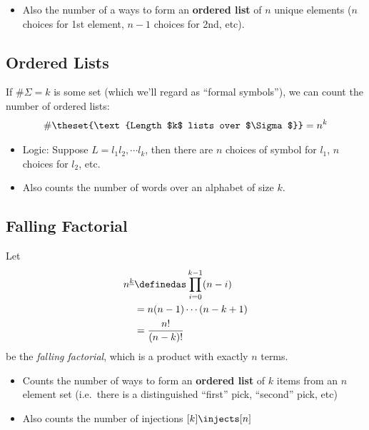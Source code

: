 \begin{itemize}
\tightlist
\item
  Also the number of a ways to form an \textbf{ordered list} of \(n\)
  unique elements (\(n\) choices for 1st element, \(n-1\) choices for
  2nd, etc).
\end{itemize}

\hypertarget{ordered-lists}{%
\subsection{Ordered Lists}\label{ordered-lists}}

If \(\#\Sigma = k\) is some set (which we'll regard as ``formal
symbols''), we can count the number of ordered lists:
\begin{align*}
\# \theset{\text{Length $k$ lists over $\Sigma$}} = n^k
\end{align*}

\begin{itemize}
\tightlist
\item
  Logic: Suppose \(L = l_1 l_2, \cdots l_k\), then there are \(n\)
  choices of symbol for \(l_1\), \(n\) choices for \(l_2\), etc.
\item
  Also counts the number of words over an alphabet of size \(k\).
\end{itemize}

\hypertarget{falling-factorial}{%
\subsection{Falling Factorial}\label{falling-factorial}}

Let
\begin{align*}\begin{aligned}
n^{\underline k} &\definedas \prod_{i=0}^{k-1}(n - i) \\
&= n(n-1)\cdots (n-k+1) \\
&= \frac{n!}{(n-k)!}
\end{aligned}\end{align*} be the \emph{falling factorial}, which is a
product with exactly \(n\) terms.

\begin{itemize}
\tightlist
\item
  Counts the number of ways to form an \textbf{ordered list} of \(k\)
  items from an \(n\) element set (i.e.~there is a distinguished
  ``first'' pick, ``second'' pick, etc)
\item
  Also counts the number of injections \([k] \injects [n]\)
\end{itemize}

